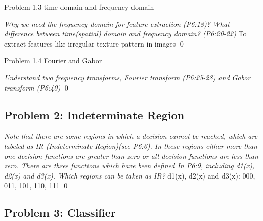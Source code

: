 \documentclass[
        ]{beamer}
\begin{document}
    		\begin{frame}[t]{Problem 1.3 time domain and frequency domain}
    			\begin{overprint}
    			\emph{Why we need the frequency domain for feature extraction (P6:18)? What difference between time(spatial) domain and frequency domain? (P6:20-22)}
    				\onslide<2>  %
    				\alert{To extract features like irregular texture pattern in images}
    				\onslide<3>  %
    				\onslide<4>  %
    				\onslide<5>  %
							\qed		
    			\end{overprint}
    		\end{frame}
    
    		\begin{frame}[t]{Problem 1.4 Fourier and Gabor}
    			\begin{overprint}
    				\onslide<1>
    			\emph{Understand two frequency transforms, Fourier transform (P6:25-28) and Gabor transform (P6:40)}
    				\onslide<2> \inpdfu{6}{13} %
    				\onslide<3> \inpdfl{6}{13} %
    				\onslide<4> \inpdfu{6}{14} %
    				\onslide<5> \inpdfl{6}{14} %
    				\onslide<6> \inpdfl{6}{20} %
							\qed		
    			\end{overprint}
    		\end{frame}

    \subsection{Problem 2: Indeterminate Region}
    
    		\begin{frame}[t]{\subsecname}
    			\begin{overprint}
    				\emph{Note that there are some regions in which a decision cannot be reached, which are labeled as IR (Indeterminate Region)(see P6:6). In these regions either more than one decision functions are greater than zero or all decision functions are less than zero. There are three functions which have been defined In P6:9, including d1(x), d2(x) and d3(x). Which regions can be taken as IR?}
    				\onslide<2> \inpdfl{6}{3} %
    				\onslide<3> \inpdfu{6}{5} %
    					d1(x), d2(x) and d3(x): 000, 011, 101, 110, \alert{111}  		
							\qed		
    			\end{overprint}
    		\end{frame}

    \subsection{Problem 3: Classifier}
    
\end{document}
